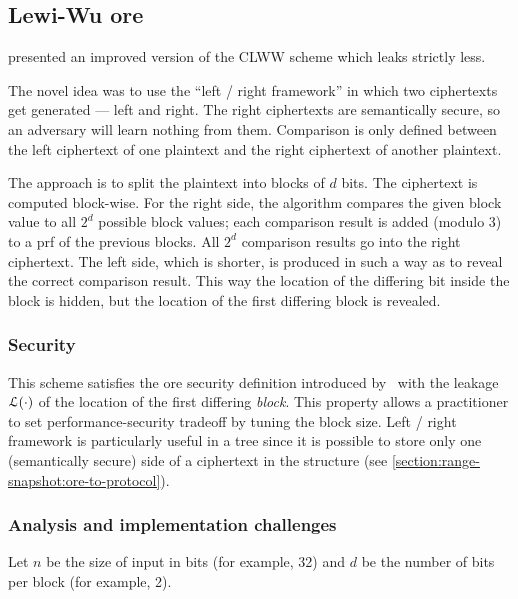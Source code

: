 \subsection{Lewi-Wu \texorpdfstring{\acrshort{ore}}{ORE}}

	\textcite{lewi-wu-ore} presented an improved version of the CLWW scheme \cite{clww-ore} which leaks strictly less.

	The novel idea was to use the ``left / right framework'' in which two ciphertexts get generated --- left and right.
	The right ciphertexts are semantically secure, so an adversary will learn nothing from them.
	Comparison is only defined between the left ciphertext of one plaintext and the right ciphertext of another plaintext.

	The approach is to split the plaintext into blocks of $d$ bits.
	The ciphertext is computed block-wise.
	For the right side, the algorithm compares the given block value to all $2^d$ possible block values; each comparison result is added (modulo 3) to a \acrshort{prf} of the previous blocks.
	All $2^d$ comparison results go into the right ciphertext.
	The left side, which is shorter, is produced in such a way as to reveal the correct comparison result.
	This way the location of the differing bit inside the block is hidden, but the location of the first differing block is revealed.

	\subsubsection{Security}

		This scheme satisfies the \acrshort{ore} security definition introduced by~\textcite{clww-ore} with the leakage $\mathcal{L}(\cdot)$ of the location of the first differing \emph{block}.
		This property allows a practitioner to set performance-security tradeoff by tuning the block size.
		Left / right framework is particularly useful in a {\BPlus} tree since it is possible to store only one (semantically secure) side of a ciphertext in the structure (see \cref{section:range-snapshot:ore-to-protocol}).

	\subsubsection{Analysis and implementation challenges}

		Let $n$ be the size of input in bits (for example, 32) and $d$ be the number of bits per block (for example, 2).

